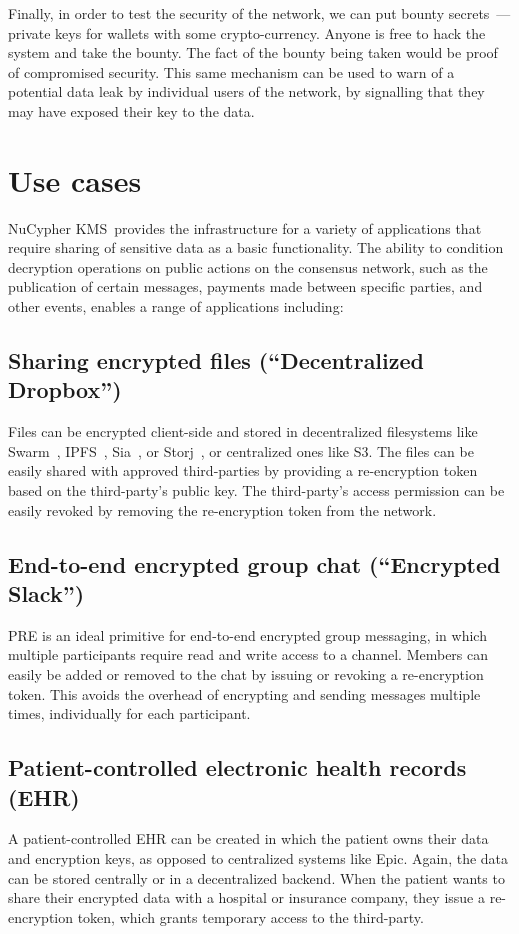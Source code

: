 \documentclass[longbibliography]{revtex4-1}
\newcommand{\kms}{NuCypher KMS}
\begin{document}
Finally, in order to test the security of the network, we can put bounty secrets~--- private keys for wallets with
some crypto-currency.
Anyone is free to hack the system and take the bounty.
The fact of the bounty being taken would be proof of compromised security.
This same mechanism can be used to warn of a potential data leak by individual users of the network, by signalling that they may have exposed
their key to the data.

\section{Use cases}
\kms~provides the infrastructure for a variety of applications that require sharing of sensitive data as a basic
functionality. The ability to condition decryption operations on public actions on the consensus network, such as the publication
of certain messages, payments made between specific parties, and other events, enables a range of applications including:

\subsection{Sharing encrypted files (``Decentralized Dropbox'')}
Files can be encrypted client-side and stored in decentralized filesystems like Swarm~\cite{swarm}, IPFS~\cite{whitepaper:ipfs}, Sia~\cite{web:sia}, or Storj~\cite{web:storj}, or centralized ones like S3.
The files can be easily shared with approved third-parties by providing a re-encryption token based on the third-party's
public key.
The third-party's access permission can be easily revoked by removing the re-encryption token from the network.

\subsection{End-to-end encrypted group chat (``Encrypted Slack'')}
PRE is an ideal primitive for end-to-end encrypted group messaging, in which multiple participants require read and write
access to a channel. Members can easily be added or removed to the chat by issuing or revoking a re-encryption token.
This avoids the overhead of encrypting and sending messages multiple times, individually for each participant.

\subsection{Patient-controlled electronic health records (EHR)}
A patient-controlled EHR can be created in which the patient owns their data and encryption keys, as opposed to centralized
systems like Epic.
Again, the data can be stored centrally or in a decentralized backend.
When the patient wants to share their encrypted data with a hospital or insurance company, they issue a re-encryption token,
which grants temporary access to the third-party.
\end{document}
